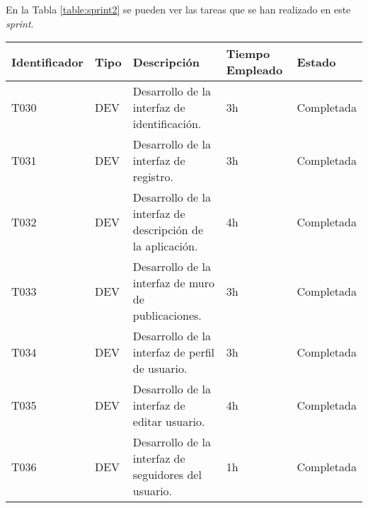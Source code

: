 En la Tabla \ref{table:sprint2} se pueden ver las tareas que se han realizado en este \textit{sprint}.


\begin{table}[]
    \centering
\begin{tabular}{
    |p{}%
    |p{}%
    |p{}
    |p{}
    |p{}
    |%
    }
    \hline
    \textbf{Identificador} & \textbf{Tipo} & \textbf{Descripción}                                             & \textbf{Tiempo Empleado} & \textbf{Estado} \\ \hline
    


    T030                      &    DEV            & Desarrollo de la interfaz de identificación.                                                               &        3h                  &           Completada      \\ \hline

    T031                      &    DEV            & Desarrollo de la interfaz de registro.                                                                &        3h                  &           Completada      \\ \hline

    T032                   & DEV           & Desarrollo de la interfaz de descripción de la aplicación.                   & 4h                       & Completada      \\ \hline

    T033                   & DEV           & Desarrollo de la interfaz de muro de publicaciones.                   & 3h                       & Completada      \\ \hline




    T034                   & DEV           & Desarrollo de la interfaz de perfil de usuario.                   & 3h                       & Completada      \\ \hline

    T035                   & DEV           & Desarrollo de la interfaz de editar usuario.                   & 4h                       & Completada      \\ \hline


    T036                   & DEV           & Desarrollo de la interfaz de seguidores del usuario.                   & 1h                       & Completada      \\ \hline


\end{tabular}
\end{table}

